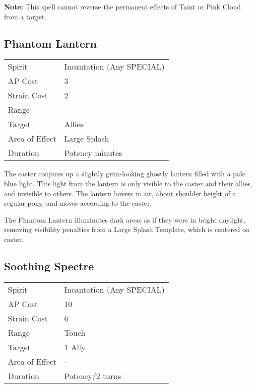 \documentclass[11pt,a4paper,twocolumn]{book}
\begin{document}
\textbf{Note:} This spell cannot reverse the permanent effects of Taint or Pink Cloud from a target.

\subsection*{Phantom Lantern}
{
	\begin{tabu} to 75mm{| X[l,4] | X[l,7] |}
		\hline
		Spirit         & Incantation (Any SPECIAL) \\
		AP Cost        & 3                         \\
		Strain Cost    & 2                         \\
		Range          & -                         \\
		Target         & Allies                    \\
		Area of Effect & Large Splash              \\
		Duration       & Potency minutes           \\ \hline
	\end{tabu}
	
}

\medskip

The caster conjures up a slightly grim-looking ghostly lantern filled with a pale blue light. This light from the lantern is only visible to the caster and their allies, and invisible to others. The lantern hovers in air, about shoulder height of a regular pony, and moves according to the caster.

The Phantom Lantern illuminates dark areas as if they were in bright daylight, removing visibility penalties from a Large Splash Template, which is centered on caster.

\subsection*{Soothing Spectre}
{
	\begin{tabu} to 75mm{| X[l,4] | X[l,7] |}
		\hline
		Spirit         & Incantation (Any SPECIAL) \\
		AP Cost        & 10                        \\
		Strain Cost    & 6                         \\
		Range          & Touch                     \\
		Target         & 1 Ally                    \\
		Area of Effect & -                         \\
		Duration       & Potency/2 turns           \\ \hline
	\end{tabu}
	
}
\end{document}
